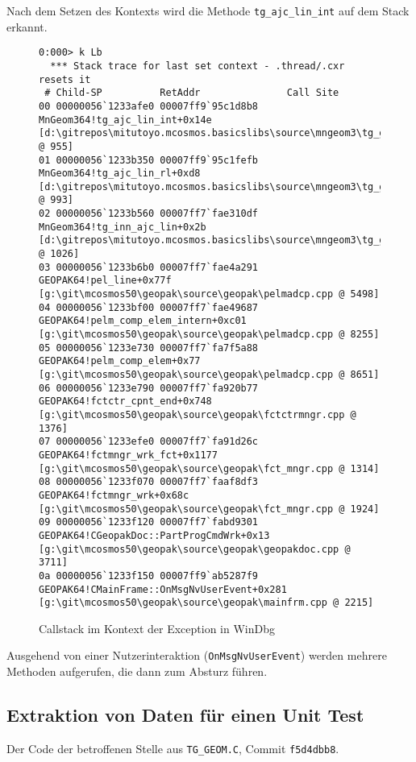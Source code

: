 Nach dem Setzen des Kontexts wird die Methode \verb|tg_ajc_lin_int| auf dem Stack erkannt.

\begin{figure}[H]
\begin{lstlisting}
0:000> k Lb
  *** Stack trace for last set context - .thread/.cxr resets it
 # Child-SP          RetAddr               Call Site
00 00000056`1233afe0 00007ff9`95c1d8b8     MnGeom364!tg_ajc_lin_int+0x14e [d:\gitrepos\mitutoyo.mcosmos.basicslibs\source\mngeom3\tg_geom.c @ 955] 
01 00000056`1233b350 00007ff9`95c1fefb     MnGeom364!tg_ajc_lin_rl+0xd8 [d:\gitrepos\mitutoyo.mcosmos.basicslibs\source\mngeom3\tg_geom.c @ 993] 
02 00000056`1233b560 00007ff7`fae310df     MnGeom364!tg_inn_ajc_lin+0x2b [d:\gitrepos\mitutoyo.mcosmos.basicslibs\source\mngeom3\tg_geom.c @ 1026] 
03 00000056`1233b6b0 00007ff7`fae4a291     GEOPAK64!pel_line+0x77f [g:\git\mcosmos50\geopak\source\geopak\pelmadcp.cpp @ 5498] 
04 00000056`1233bf00 00007ff7`fae49687     GEOPAK64!pelm_comp_elem_intern+0xc01 [g:\git\mcosmos50\geopak\source\geopak\pelmadcp.cpp @ 8255] 
05 00000056`1233e730 00007ff7`fa7f5a88     GEOPAK64!pelm_comp_elem+0x77 [g:\git\mcosmos50\geopak\source\geopak\pelmadcp.cpp @ 8651] 
06 00000056`1233e790 00007ff7`fa920b77     GEOPAK64!fctctr_cpnt_end+0x748 [g:\git\mcosmos50\geopak\source\geopak\fctctrmngr.cpp @ 1376] 
07 00000056`1233efe0 00007ff7`fa91d26c     GEOPAK64!fctmngr_wrk_fct+0x1177 [g:\git\mcosmos50\geopak\source\geopak\fct_mngr.cpp @ 1314] 
08 00000056`1233f070 00007ff7`faaf8df3     GEOPAK64!fctmngr_wrk+0x68c [g:\git\mcosmos50\geopak\source\geopak\fct_mngr.cpp @ 1924] 
09 00000056`1233f120 00007ff7`fabd9301     GEOPAK64!CGeopakDoc::PartProgCmdWrk+0x13 [g:\git\mcosmos50\geopak\source\geopak\geopakdoc.cpp @ 3711] 
0a 00000056`1233f150 00007ff9`ab5287f9     GEOPAK64!CMainFrame::OnMsgNvUserEvent+0x281 [g:\git\mcosmos50\geopak\source\geopak\mainfrm.cpp @ 2215] 
\end{lstlisting}
\caption{Callstack im Kontext der Exception in WinDbg}
\end{figure}

Ausgehend von einer Nutzerinteraktion (\verb|OnMsgNvUserEvent|) werden mehrere Methoden aufgerufen, die dann zum Absturz führen.

\subsection{Extraktion von Daten für einen Unit Test}

Der Code der betroffenen Stelle aus \verb|TG_GEOM.C|, Commit \verb|f5d4dbb8|.

